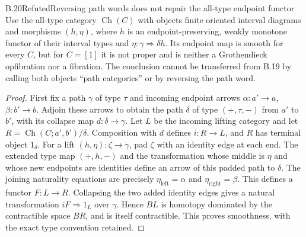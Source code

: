 \begin{claim}{B.20}{Refuted}{Reversing path words does not repair the all-type endpoint functor}
Use the all-type category $\operatorname{Ch}(C)$ with objects finite
oriented interval diagrams and morphisms $(h,\eta)$, where $h$ is an
endpoint-preserving, weakly monotone functor of their interval types and
$\eta:\gamma\Rightarrow\delta h$. Its endpoint map is smooth for every $C$, but for $C=[1]$
it is not proper and is neither a Grothendieck opfibration nor a fibration.
The conclusion cannot be transferred from B.19 by calling both objects
``path categories'' or by reversing the path word.
\end{claim}
\begin{proof}
First fix a path $\gamma$ of type $\tau$ and incoming endpoint arrows
$\alpha:a'\to a$, $\beta:b'\to b$. Adjoin these arrows to obtain the
path $\delta$ of type $(+,\tau,-)$ from $a'$ to $b'$, with its collapse
map $d:\delta\to\gamma$. Let $L$ be the incoming lifting category
and let $R=\operatorname{Ch}(C;a',b')/\delta$. Composition with $d$
defines $i:R\to L$, and $R$ has terminal object $1_\delta$.
For a lift $(h,\eta):\zeta\to\gamma$, pad $\zeta$ with an identity
edge at each end. The extended type map $(+,h,-)$ and the transformation
whose middle is $\eta$ and whose new endpoints are identities define
an arrow of this padded path to $\delta$. The joining naturality equations
are precisely $\eta_{\mathrm{left}}=\alpha$ and
$\eta_{\mathrm{right}}=\beta$. This defines a functor $F:L\to R$.
Collapsing the two added identity edges gives a natural transformation
$iF\Rightarrow1_L$ over $\gamma$. Hence $BL$ is homotopy dominated
by the contractible space $BR$, and is itself contractible. This proves
smoothness, with the exact type convention retained.


\end{proof}
